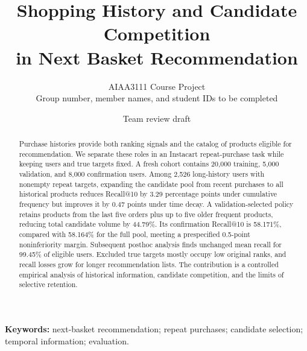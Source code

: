 \documentclass[11pt,letterpaper]{article}
\title{Shopping History and Candidate Competition\\
in Next Basket Recommendation}
\author{AIAA3111 Course Project\\
\small Group number, member names, and student IDs to be completed}
\date{\small Team review draft}
\begin{document}
\maketitle

\begin{abstract}
Purchase histories provide both ranking signals and the catalog of products eligible for recommendation. We separate these roles in an Instacart repeat-purchase task while keeping users and true targets fixed. A fresh cohort contains 20,000 training, 5,000 validation, and 8,000 confirmation users. Among 2,526 long-history users with nonempty repeat targets, expanding the candidate pool from recent purchases to all historical products reduces Recall@10 by 3.29 percentage points under cumulative frequency but improves it by 0.47 points under time decay. A validation-selected policy retains products from the last five orders plus up to five older frequent products, reducing total candidate volume by 44.79\%. Its confirmation Recall@10 is 58.171\%, compared with 58.164\% for the full pool, meeting a prespecified 0.5-point noninferiority margin. Subsequent posthoc analysis finds unchanged mean recall for 99.45\% of eligible users. Excluded true targets mostly occupy low original ranks, and recall losses grow for longer recommendation lists. The contribution is a controlled empirical analysis of historical information, candidate competition, and the limits of selective retention.
\end{abstract}

\noindent\textbf{Keywords:} next-basket recommendation; repeat purchases; candidate selection; temporal information; evaluation.








\end{document}

